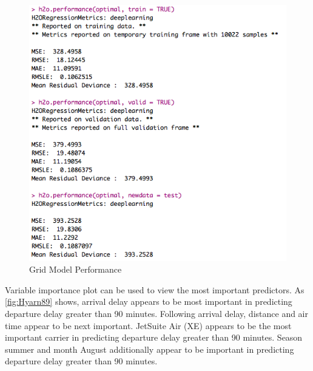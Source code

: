 \documentclass[12pt,twoside]{amherstthesis}
\begin{document}
  \begin{figure}[htbp]
  \centering
  \includegraphics[scale = 0.8,angle = 0]{figure/DeepGridPerform.png}
  \caption[Grid Model Performance]{\normalsize{Grid Model Performance}}
  \label{fig:Hyarn122}
  \end{figure}
  
  Variable importance plot can be used to view the most important
  predictors. As \autoref{fig:Hyarn89} shows, arrival delay appears to be
  most important in predicting departure delay greater than 90 minutes.
  Following arrival delay, distance and air time appear to be next
  important. JetSuite Air (XE) appears to be the most important carrier in
  predicting departure delay greater than 90 minutes. Season summer and
  month August additionally appear to be important in predicting departure
  delay greater than 90 minutes.
  
  \begin{Shaded}
  \begin{Highlighting}[]
   \NormalTok{)}
  \end{Highlighting}
  \end{Shaded}
  
\end{document}
